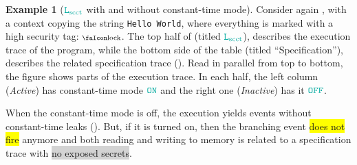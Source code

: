 \documentclass[acmsmall]{acmart}
\theoremstyle{definition}
\newtheorem{exampleenv}{Example}[section]
\begin{document}
\begin{exampleenv}[$\Lscct$ with and without constant-time mode]\label{ex:lscct}
  Consider again , with a context copying the string \texttt{Hello World}, where everything is marked with a high security tag: $\lock$.
  The top half of  (titled $\Lscct$), describes the execution trace of the program, while the bottom side of the table (titled ``Specification''), describes the related specification trace ().
  Read in parallel from top to bottom, the figure shows parts of the execution trace. 
  In each half, the left column (\textit{Active}) has constant-time mode $\obj{ON}$ and the right one (\textit{Inactive}) has it $\obj{OFF}$.
  
  When the constant-time mode is off, the execution yields events without constant-time leaks ().
  But, if it is turned on, then the branching event \colorbox{yellow}{does not fire} anymore and both reading and writing to memory is related to a specification trace with \colorbox{lightgray}{no exposed secrets}.
\end{exampleenv}
\end{document}
